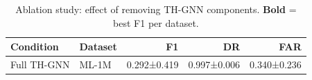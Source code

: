 \begin{table}[t]
\centering
\small
\caption{Ablation study: effect of removing TH-GNN components.  \textbf{Bold} = best F1 per dataset.}
\label{tab:ablation}
\begin{tabular}{llrrr}
\toprule
Condition & Dataset & F1 & DR & FAR \\
\midrule
Full TH-GNN & ML-1M & 0.292±0.419 & 0.997±0.006 & 0.340±0.236 \\
\bottomrule
\end{tabular}
\end{table}
